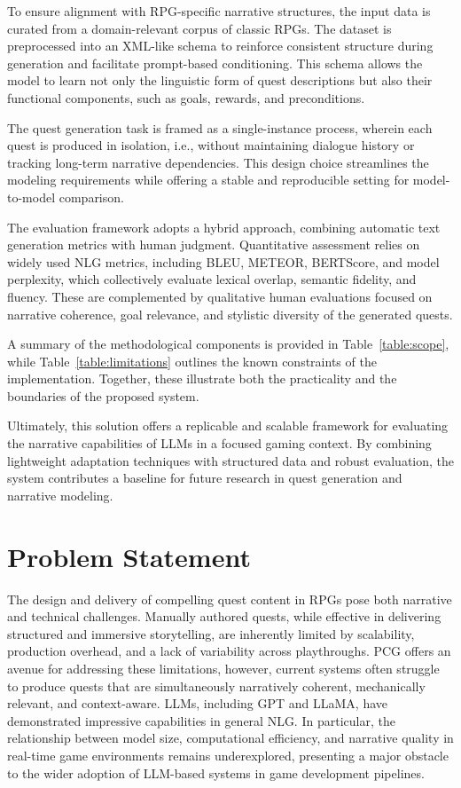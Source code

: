 To ensure alignment with RPG-specific narrative structures, the input data is curated
from a domain-relevant corpus of classic RPGs. The dataset is preprocessed into an XML-like
schema to reinforce consistent structure during generation and facilitate prompt-based
conditioning. This schema allows the model to learn not only the linguistic form
of quest descriptions but also their functional components, such as goals, rewards, and
preconditions.

The quest generation task is framed as a single-instance process, wherein each quest
is produced in isolation, i.e., without maintaining dialogue history or tracking long-term
narrative dependencies. This design choice streamlines the modeling requirements while
offering a stable and reproducible setting for model-to-model comparison.

The evaluation framework adopts a hybrid approach, combining automatic text generation
metrics with human judgment. Quantitative assessment relies on widely used NLG
metrics, including BLEU, METEOR, BERTScore, and model perplexity, which collectively
evaluate lexical overlap, semantic fidelity, and fluency. These are complemented by
qualitative human evaluations focused on narrative coherence, goal relevance, and stylistic
diversity of the generated quests.

A summary of the methodological components is provided in Table~\ref{table:scope}, while Table~\ref{table:limitations}
outlines the known constraints of the implementation. Together, these illustrate both the
practicality and the boundaries of the proposed system.

Ultimately, this solution offers a replicable and scalable framework for evaluating the
narrative capabilities of LLMs in a focused gaming context. By combining lightweight
adaptation techniques with structured data and robust evaluation, the system contributes
a baseline for future research in quest generation and narrative modeling.

\section{Problem Statement}

The design and delivery of compelling quest content in RPGs pose both narrative and
technical challenges. Manually authored quests, while effective in delivering structured
and immersive storytelling, are inherently limited by scalability, production overhead,
and a lack of variability across playthroughs. PCG offers an avenue for addressing these
limitations, however, current systems often struggle to produce quests that are simultaneously
narratively coherent, mechanically relevant, and context-aware. LLMs, including
GPT and LLaMA, have demonstrated impressive capabilities in general NLG. In particular,
the relationship between model size, computational efficiency, and narrative quality
in real-time game environments remains underexplored, presenting a major obstacle to
the wider adoption of LLM-based systems in game development pipelines.

